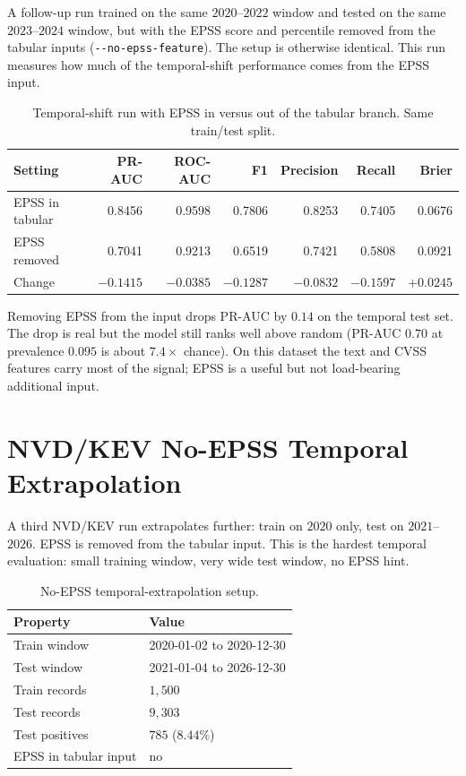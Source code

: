 \documentclass[11pt]{article}
\begin{document}
A follow-up run trained on the same $2020$--$2022$ window and tested
on the same $2023$--$2024$ window, but with the EPSS score and
percentile removed from the tabular inputs (\texttt{-{}-no-epss-feature}).
The setup is otherwise identical. This run measures how much of the
temporal-shift performance comes from the EPSS input.

\begin{table}[h]
\centering
\small
\begin{tabular}{lrrrrrr}
\toprule
Setting & PR-AUC & ROC-AUC & F1 & Precision & Recall & Brier \\
\midrule
EPSS in tabular   & 0.8456 & 0.9598 & 0.7806 & 0.8253 & 0.7405 & 0.0676 \\
EPSS removed      & 0.7041 & 0.9213 & 0.6519 & 0.7421 & 0.5808 & 0.0921 \\
Change            & $-0.1415$ & $-0.0385$ & $-0.1287$ & $-0.0832$ & $-0.1597$ & $+0.0245$ \\
\bottomrule
\end{tabular}
\caption{Temporal-shift run with EPSS in versus out of the tabular
branch. Same train/test split.}
\end{table}

Removing EPSS from the input drops PR-AUC by $0.14$ on the temporal
test set. The drop is real but the model still ranks well above
random (PR-AUC $0.70$ at prevalence $0.095$ is about $7.4\times$
chance). On this dataset the text and CVSS features carry most of the
signal; EPSS is a useful but not load-bearing additional input.

\section{NVD/KEV No-EPSS Temporal Extrapolation}

A third NVD/KEV run extrapolates further: train on $2020$ only, test
on $2021$--$2026$. EPSS is removed from the tabular input. This is
the hardest temporal evaluation: small training window, very wide
test window, no EPSS hint.

\begin{table}[h]
\centering
\small
\begin{tabular}{ll}
\toprule
Property & Value \\
\midrule
Train window & 2020-01-02 to 2020-12-30 \\
Test window  & 2021-01-04 to 2026-12-30 \\
Train records & $1{,}500$ \\
Test records  & $9{,}303$ \\
Test positives & $785$ ($8.44\%$) \\
EPSS in tabular input & no \\
\bottomrule
\end{tabular}
\caption{No-EPSS temporal-extrapolation setup.}
\end{table}
\end{document}
